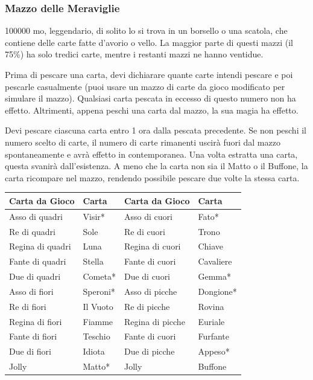 \begin{multicols}{2}

	\medskip

	\subsubsection*{Mazzo delle Meraviglie}
	100000 mo, leggendario, di solito lo si trova in un borsello o una scatola, che contiene delle carte fatte d'avorio o vello. La maggior parte di questi mazzi (il 75\%) ha solo tredici carte, mentre i restanti mazzi ne hanno ventidue.

	Prima di pescare una carta, devi dichiarare quante carte intendi pescare e poi pescarle casualmente (puoi usare un mazzo di carte da gioco modificato per simulare il mazzo). Qualsiasi carta pescata in eccesso di questo numero non ha effetto. Altrimenti, appena peschi una carta dal mazzo, la sua magia ha effetto.

	Devi pescare ciascuna carta entro 1 ora dalla pescata precedente. Se non peschi il numero scelto di carte, il numero di carte rimanenti uscirà fuori dal mazzo spontaneamente e avrà effetto in contemporanea. Una volta estratta una carta, questa svanirà dall'esistenza. A meno che la carta non sia il Matto o il Buffone, la carta ricompare nel mazzo, rendendo possibile pescare due volte la stessa carta.

	\medskip

\end{multicols}

\begin{tabularx}{0.95\textwidth}{lX|lX}
	\textbf{Carta da Gioco}& \textbf{Carta}&\textbf{Carta da Gioco}& \textbf{Carta}\\
	\hline
	Asso di quadri& Visir*&Asso di cuori &Fato*\\
	Re di quadri &Sole&Re di cuori &Trono\\
	Regina di quadri& Luna&Regina di cuori& Chiave\\
	Fante di quadri &Stella&Fante di cuori& Cavaliere\\
	Due di quadri &Cometa*&Due di cuori &Gemma*\\
	Asso di fiori &Speroni*&Asso di picche& Dongione*\\
	Re di fiori &Il Vuoto&Re di picche& Rovina\\
	Regina di fiori& Fiamme&Regina di picche &Euriale\\
	Fante di fiori &Teschio&Fante di cuori& Furfante\\
	Due di fiori &Idiota&Due di picche &Appeso*\\
	Jolly &Matto*&Jolly &Buffone\\
\end{tabularx}

